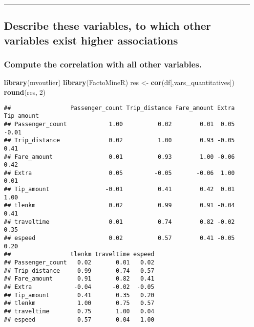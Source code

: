 \documentclass[
  18pt,
  a4paper]{article}
\newenvironment{Shaded}{\begin{snugshade}}{\end{snugshade}}
\newcommand{\DecValTok}[1]{\textcolor[rgb]{0.00,0.00,0.81}{#1}}
\newcommand{\KeywordTok}[1]{\textcolor[rgb]{0.13,0.29,0.53}{\textbf{#1}}}
\newcommand{\NormalTok}[1]{#1}
\newcommand{\StringTok}[1]{\textcolor[rgb]{0.31,0.60,0.02}{#1}}
\begin{document}
\begin{center}\rule{0.5\linewidth}{0.5pt}\end{center}

\hypertarget{describe-these-variables-to-which-other-variables-exist-higher-associations}{%
\subsection{Describe these variables, to which other variables exist
higher
associations}\label{describe-these-variables-to-which-other-variables-exist-higher-associations}}

\hypertarget{compute-the-correlation-with-all-other-variables.}{%
\subsubsection{Compute the correlation with all other
variables.}\label{compute-the-correlation-with-all-other-variables.}}

\begin{Shaded}
\begin{Highlighting}[]
\KeywordTok{library}\NormalTok{(mvoutlier)}
\KeywordTok{library}\NormalTok{(FactoMineR)}
\NormalTok{res <-}\StringTok{ }\KeywordTok{cor}\NormalTok{(df[,vars_quantitatives])}
\KeywordTok{round}\NormalTok{(res, }\DecValTok{2}\NormalTok{)}
\end{Highlighting}
\end{Shaded}

\begin{verbatim}
##                 Passenger_count Trip_distance Fare_amount Extra Tip_amount
## Passenger_count            1.00          0.02        0.01  0.05      -0.01
## Trip_distance              0.02          1.00        0.93 -0.05       0.41
## Fare_amount                0.01          0.93        1.00 -0.06       0.42
## Extra                      0.05         -0.05       -0.06  1.00       0.01
## Tip_amount                -0.01          0.41        0.42  0.01       1.00
## tlenkm                     0.02          0.99        0.91 -0.04       0.41
## traveltime                 0.01          0.74        0.82 -0.02       0.35
## espeed                     0.02          0.57        0.41 -0.05       0.20
##                 tlenkm traveltime espeed
## Passenger_count   0.02       0.01   0.02
## Trip_distance     0.99       0.74   0.57
## Fare_amount       0.91       0.82   0.41
## Extra            -0.04      -0.02  -0.05
## Tip_amount        0.41       0.35   0.20
## tlenkm            1.00       0.75   0.57
## traveltime        0.75       1.00   0.04
## espeed            0.57       0.04   1.00
\end{verbatim}
\end{document}
